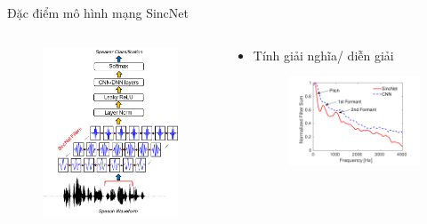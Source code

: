 \documentclass[11pt]{beamer}
\begin{document}
\begin{frame}{Đặc điểm mô hình mạng SincNet}
	\begin{columns}
		\begin{column}{0.47\textwidth}
			\begin{figure}[H]
				\includegraphics[width=0.9\linewidth]{images/SincNet.png}
			\end{figure}
		\end{column}
		\begin{column}{0.5\textwidth}
			\begin{itemize}
				\item Tính giải nghĩa/ diễn giải
				\begin{figure}[H]
					\includegraphics[width=0.9\linewidth]{images/interpretability.png}
				\end{figure}
			\end{itemize}
		\end{column}
	\end{columns}
\end{frame}
\end{document}
